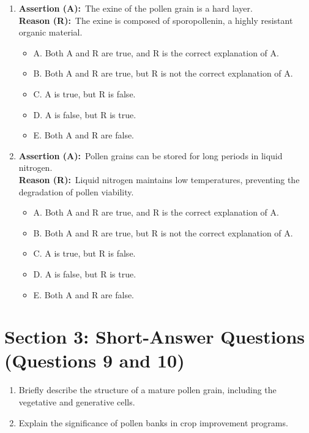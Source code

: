 \documentclass{article}
\begin{document}
\begin{enumerate}
    \item \textbf{Assertion (A):}\ The exine of the pollen grain is a hard layer. \\
    \textbf{Reason (R):}\ The exine is composed of sporopollenin, a highly resistant organic material.
        \begin{itemize}
            \item A. Both A and R are true, and R is the correct explanation of A.
            \item B. Both A and R are true, but R is not the correct explanation of A.
            \item C. A is true, but R is false.
            \item D. A is false, but R is true.
            \item E. Both A and R are false.
        \end{itemize}
        
    \item \textbf{Assertion (A):}\ Pollen grains can be stored for long periods in liquid nitrogen. \\
    \textbf{Reason (R):}\ Liquid nitrogen maintains low temperatures, preventing the degradation of pollen viability.
        \begin{itemize}
            \item A. Both A and R are true, and R is the correct explanation of A.
            \item B. Both A and R are true, but R is not the correct explanation of A.
            \item C. A is true, but R is false.
            \item D. A is false, but R is true.
            \item E. Both A and R are false.
        \end{itemize}
\end{enumerate}

\section*{Section 3: Short-Answer Questions (Questions 9 and 10)}

\begin{enumerate}
    \item Briefly describe the structure of a mature pollen grain, including the vegetative and generative cells.
    \item Explain the significance of pollen banks in crop improvement programs.
\end{enumerate}
\end{document}
